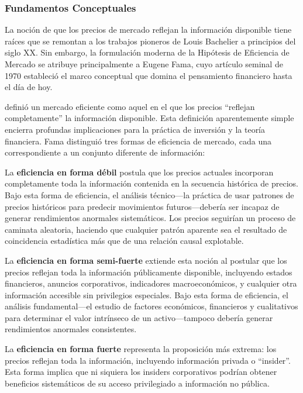 \documentclass[11pt,a4paper]{article}
\begin{document}
\subsubsection{Fundamentos Conceptuales}

La noción de que los precios de mercado reflejan la información disponible tiene raíces que se remontan a los trabajos pioneros de Louis Bachelier a principios del siglo XX. Sin embargo, la formulación moderna de la Hipótesis de Eficiencia de Mercado se atribuye principalmente a Eugene Fama, cuyo artículo seminal de 1970 estableció el marco conceptual que domina el pensamiento financiero hasta el día de hoy.

\citet{fama1970} definió un mercado eficiente como aquel en el que los precios ``reflejan completamente'' la información disponible. Esta definición aparentemente simple encierra profundas implicaciones para la práctica de inversión y la teoría financiera. Fama distinguió tres formas de eficiencia de mercado, cada una correspondiente a un conjunto diferente de información:

La \textbf{eficiencia en forma débil} postula que los precios actuales incorporan completamente toda la información contenida en la secuencia histórica de precios. Bajo esta forma de eficiencia, el análisis técnico---la práctica de usar patrones de precios históricos para predecir movimientos futuros---debería ser incapaz de generar rendimientos anormales sistemáticos. Los precios seguirían un proceso de caminata aleatoria, haciendo que cualquier patrón aparente sea el resultado de coincidencia estadística más que de una relación causal explotable.

La \textbf{eficiencia en forma semi-fuerte} extiende esta noción al postular que los precios reflejan toda la información públicamente disponible, incluyendo estados financieros, anuncios corporativos, indicadores macroeconómicos, y cualquier otra información accesible sin privilegios especiales. Bajo esta forma de eficiencia, el análisis fundamental---el estudio de factores económicos, financieros y cualitativos para determinar el valor intrínseco de un activo---tampoco debería generar rendimientos anormales consistentes.

La \textbf{eficiencia en forma fuerte} representa la proposición más extrema: los precios reflejan toda la información, incluyendo información privada o ``insider''. Esta forma implica que ni siquiera los insiders corporativos podrían obtener beneficios sistemáticos de su acceso privilegiado a información no pública.
\end{document}
